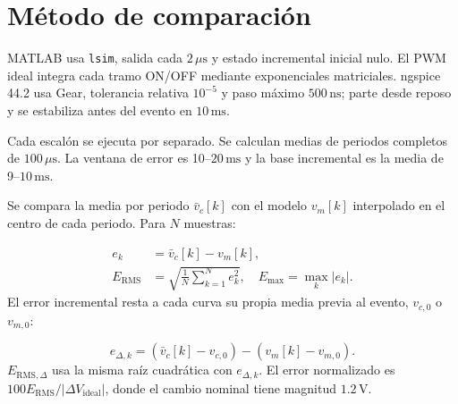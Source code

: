 \documentclass[conference,letterpaper]{IEEEtran}
\begin{document}
\section{Método de comparación}
MATLAB \cite{matlab} usa \texttt{lsim}, salida cada $2\,\mu\mathrm{s}$ y estado incremental inicial nulo. El PWM ideal integra cada tramo ON/OFF mediante exponenciales matriciales. ngspice 44.2 \cite{ngspice} usa Gear, tolerancia relativa $10^{-5}$ y paso máximo $500\,\mathrm{ns}$; parte desde reposo y se estabiliza antes del evento en $10\,\mathrm{ms}$.

Cada escalón se ejecuta por separado. Se calculan medias de periodos completos de $100\,\mu\mathrm{s}$. La ventana de error es 10--$20\,\mathrm{ms}$ y la base incremental es la media de 9--$10\,\mathrm{ms}$.

Se compara la media por periodo $\bar v_c[k]$ con el modelo $v_m[k]$ interpolado en el centro de cada periodo. Para $N$ muestras:

\begin{equation}\label{eq:errors}\begin{aligned}e_k&=\bar v_c[k]-v_m[k],\\E_{\mathrm{RMS}}&=\sqrt{\frac1N\sum_{k=1}^N e_k^2},\quad E_{\max}=\max_k|e_k|.\end{aligned}\end{equation}
El error incremental resta a cada curva su propia media previa al evento, $v_{c,0}$ o $v_{m,0}$:

\begin{equation}\label{eq:incremental}e_{\Delta,k}=(\bar v_c[k]-v_{c,0})-(v_m[k]-v_{m,0}).\end{equation}
$E_{\mathrm{RMS},\Delta}$ usa la misma raíz cuadrática con $e_{\Delta,k}$. El error normalizado es $100E_{\mathrm{RMS}}/|\Delta V_{\mathrm{ideal}}|$, donde el cambio nominal tiene magnitud $1.2\,\mathrm{V}$.
\end{document}
